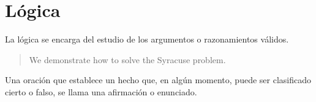 \documentclass[11pt]{article}
\author{Antonio Moreno}
\date{\today}
\title{}
\begin{document}
\tableofcontents


\section{Lógica}
\label{sec:orgdf41137}
La lógica se encarga del estudio de los argumentos o razonamientos válidos.

\begin{abstract}
We demonstrate how to solve the Syracuse problem.
\end{abstract}


\begin{definition}
Una oración que establece un hecho que, en algún momento, puede ser clasificado cierto o falso, se llama una afirmación o enunciado.
\end{definition}
\end{document}
